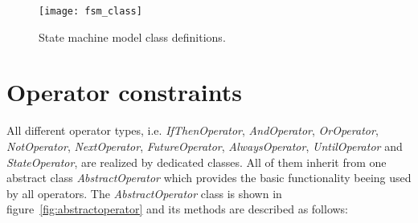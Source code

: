 \begin{figure}[htbp]
  \centering
  \texttt{[image: fsm\_class]} 
  \caption{State machine model class definitions.}
  \label{fig:fsm_class}
\end{figure}




\section{Operator constraints}
\label{sec:prototype:operatorconstraints}

All different operator types, i.e. \emph{IfThenOperator}, \emph{AndOperator}, \emph{OrOperator}, \emph{NotOperator}, \emph{NextOperator}, \emph{FutureOperator}, \emph{AlwaysOperator}, \emph{UntilOperator} and \emph{StateOperator}, are realized by dedicated classes. All of them inherit from one abstract class \emph{AbstractOperator} which provides the basic functionality beeing used by all operators. The \emph{AbstractOperator} class is shown in figure~\ref{fig:abstractoperator} and its methods are described as follows:

